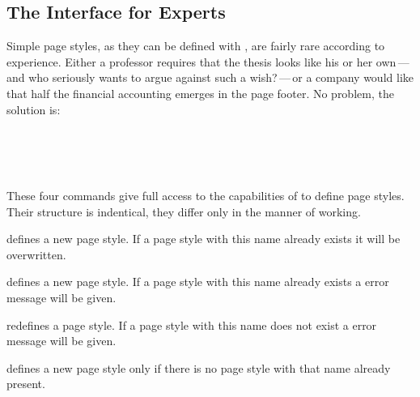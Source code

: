 \subsection{The Interface for Experts}\label{sec:scrpage.UI.expert}
{}
Simple page styles, as they can be defined with ,
are fairly rare according to experience.  Either a professor requires
that the thesis looks like his or her own\,---\,and who seriously wants
to argue against such a wish?\,---\,or a company would like that half the
financial accounting emerges in the page footer.  No problem, the
solution is:
%
\begin{Declaration}
\\
\\
\\
\end{Declaration}%
%
%
These four commands give full access to the capabilities of
 to define page styles.  Their structure is
indentical, they differ only in the manner of working.
\begin{labeling}[\ --]{}
\item[\Macro{defpagestyle}] defines a new page style.
If a page style with this name already exists it will be overwritten.
\item[\Macro{newpagestyle}] defines a new page style.
If a page style with this name already exists a error message will be given.
\item[\Macro{renewpagestyle}] redefines a page style.
If a page style with this name does not exist a error message will be given.
\item[\Macro{providepagestyle}] defines a new page style only if there is no page style with that name already present.
\end{labeling}


